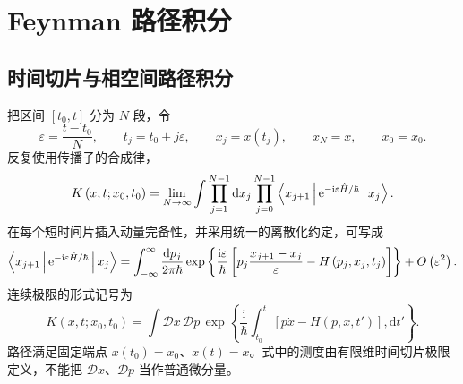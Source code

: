 \section{Feynman 路径积分}
\subsection{时间切片与相空间路径积分}
把区间 $\left[t_0,t\right]$ 分为 $N$ 段，令
\begin{equation}
\varepsilon=\frac{t-t_0}{N},
\qquad t_j=t_0+j\varepsilon,
\qquad x_j=x\left(t_j\right),
\qquad x_N=x,
\qquad x_0=x_0.
\end{equation}
反复使用传播子的合成律，
\begin{equation}
K\left(x,t;x_0,t_0\right)=
\lim_{N\to\infty}\int\prod_{j=1}^{N-1}\mathrm{d}x_j
\prod_{j=0}^{N-1}\Braket{x_{j+1}|\mathrm{e}^{-\mathrm{i}\varepsilon\hat H/\hbar}|x_j}.
\label{eq:time-sliced-K}
\end{equation}
在每个短时间片插入动量完备性，并采用统一的离散化约定，可写成
\begin{equation}
\Braket{x_{j+1}|\mathrm{e}^{-\mathrm{i}\varepsilon\hat H/\hbar}|x_j}
=\int_{-\infty}^{\infty}\frac{\mathrm{d}p_j}{2\pi\hbar}
\exp\left\{\frac{\mathrm{i}\varepsilon}{\hbar}
\left[p_j\frac{x_{j+1}-x_j}{\varepsilon}-H\left(p_j,x_j,t_j\right)\right]\right\}
+O\left(\varepsilon^2\right).
\end{equation}
连续极限的形式记号为
\begin{equation}
\boxed{K\left(x,t;x_0,t_0\right)=
\int\mathcal D x\,\mathcal D p\,
\exp\left\{\frac{\mathrm{i}}{\hbar}
\int_{t_0}^{t}\left[p\dot x-H\left(p,x,t'\right)\right],\mathrm{d}t'\right\}.}
\label{eq:phase-space-path-integral}
\end{equation}
路径满足固定端点 $x\left(t_0\right)=x_0$、$x\left(t\right)=x$。式中的测度由有限维时间切片极限定义，不能把 $\mathcal D x$、$\mathcal D p$ 当作普通微分量。


